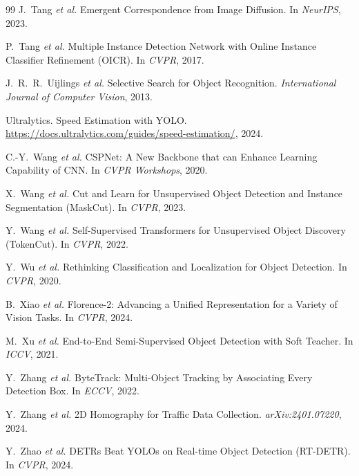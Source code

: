 \begin{thebibliography}{99}
J.~Tang \textit{et al.}
\newblock Emergent Correspondence from Image Diffusion.
\newblock In \textit{NeurIPS}, 2023.

P.~Tang \textit{et al.}
\newblock Multiple Instance Detection Network with Online Instance Classifier Refinement (OICR).
\newblock In \textit{CVPR}, 2017.

J.~R.~R.~Uijlings \textit{et al.}
\newblock Selective Search for Object Recognition.
\newblock \textit{International Journal of Computer Vision}, 2013.

Ultralytics.
\newblock Speed Estimation with YOLO.
\newblock \url{https://docs.ultralytics.com/guides/speed-estimation/}, 2024.

C.-Y.~Wang \textit{et al.}
\newblock CSPNet: A New Backbone that can Enhance Learning Capability of CNN.
\newblock In \textit{CVPR Workshops}, 2020.

X.~Wang \textit{et al.}
\newblock Cut and Learn for Unsupervised Object Detection and Instance Segmentation (MaskCut).
\newblock In \textit{CVPR}, 2023.

Y.~Wang \textit{et al.}
\newblock Self-Supervised Transformers for Unsupervised Object Discovery (TokenCut).
\newblock In \textit{CVPR}, 2022.

Y.~Wu \textit{et al.}
\newblock Rethinking Classification and Localization for Object Detection.
\newblock In \textit{CVPR}, 2020.

B.~Xiao \textit{et al.}
\newblock Florence-2: Advancing a Unified Representation for a Variety of Vision Tasks.
\newblock In \textit{CVPR}, 2024.

M.~Xu \textit{et al.}
\newblock End-to-End Semi-Supervised Object Detection with Soft Teacher.
\newblock In \textit{ICCV}, 2021.

Y.~Zhang \textit{et al.}
\newblock ByteTrack: Multi-Object Tracking by Associating Every Detection Box.
\newblock In \textit{ECCV}, 2022.

Y.~Zhang \textit{et al.}
\newblock 2D Homography for Traffic Data Collection.
\newblock \textit{arXiv:2401.07220}, 2024.

Y.~Zhao \textit{et al.}
\newblock DETRs Beat YOLOs on Real-time Object Detection (RT-DETR).
\newblock In \textit{CVPR}, 2024.


\end{thebibliography}
